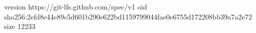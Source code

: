version https://git-lfs.github.com/spec/v1
oid sha256:2efd8e44e89c5d601b290e622bd1159799044fae0e6755d172208bb39a7a2e72
size 12233
